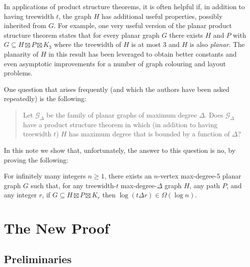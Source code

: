 \documentclass{patmorin}
\begin{document}
In applications of product structure theorems, it is often helpful if, in addition to having treewidth $t$, the graph $H$ has additional useful properties, possibly inherited from $G$.  For example, one very useful version of the planar product structure theorem states that for every planar graph $G$ there exists $H$ and $P$ with $G\subseteq H\boxtimes P\boxtimes K_3$ where the treewidth of $H$ is at most $3$ and $H$ is also \emph{planar}.  The planarity of $H$ in this result has been leveraged to obtain better constants and even asymptotic improvements for a number of graph colouring and layout problems.

One question that arises frequently (and which the authors have been asked repeatedly) is the following:
\begin{quote}
  Let $\mathcal{G}_\Delta$ be the family of planar graphs of maximum degree $\Delta$.  Does $\mathcal{G}_\Delta$ have a product structure theorem in which (in addition to having treewidth $t$) $H$ has maximum degree that is bounded by a function of $\Delta$?
\end{quote}
In this note we show that, unfortunately, the answer to this question is no, by proving the following:

\begin{thm}\label{treewidth_1_bounded_degree}
  For infinitely many integers $n\ge 1$, there exists an $n$-vertex max-degree-$5$ planar graph $G$ such that, for any treewidth-$t$ max-degree-$\Delta$ graph $H$, any path $P$, and any integer $r$,  if $G\subseteq H\boxtimes P\boxtimes K_r$ then $\log(t\Delta r)\in\Omega(\log n)$.
\end{thm}

\section{The New Proof}


\subsection{Preliminaries}
\end{document}
